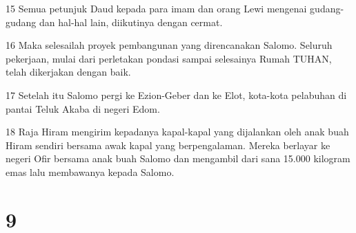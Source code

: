 \par 15 Semua petunjuk Daud kepada para imam dan orang Lewi mengenai gudang-gudang dan hal-hal lain, diikutinya dengan cermat.
\par 16 Maka selesailah proyek pembangunan yang direncanakan Salomo. Seluruh pekerjaan, mulai dari perletakan pondasi sampai selesainya Rumah TUHAN, telah dikerjakan dengan baik.
\par 17 Setelah itu Salomo pergi ke Ezion-Geber dan ke Elot, kota-kota pelabuhan di pantai Teluk Akaba di negeri Edom.
\par 18 Raja Hiram mengirim kepadanya kapal-kapal yang dijalankan oleh anak buah Hiram sendiri bersama awak kapal yang berpengalaman. Mereka berlayar ke negeri Ofir bersama anak buah Salomo dan mengambil dari sana 15.000 kilogram emas lalu membawanya kepada Salomo.

\chapter{9}


